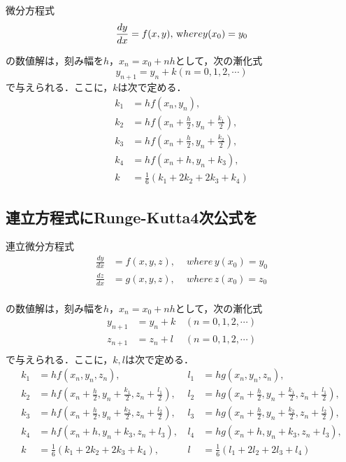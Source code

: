 \documentclass[11pt,dvipdfmx]{jsarticle}
\begin{document}
微分方程式 \[
\frac{dy}{dx} = f(x,y), \, {\textrm where}y(x_0)=y_0
\]

の数値解は，刻み幅を\(h\)，\(x_n=x_0+nh\)として，次の漸化式 \[
y_{n+1} = y_n +k (n=0,1,2,\cdots)
\] で与えられる．ここに，\(k\)は次で定める． \[
\begin{aligned}
k_1 & = hf(x_n,y_n), \\
k_2 & = hf(x_n+\frac{h}{2}, y_n+\frac{k_1}{2}), \\
k_3 & = hf(x_n+\frac{h}{2}, y_n+\frac{k_2}{2}), \\
k_4 & = hf(x_n+h, y_n+k_3), \\
k & = \frac{1}{6}(k_1+2k_2+2k_3+k_4)
\end{aligned}
\]

    \subsection{連立方程式にRunge-Kutta4次公式を}\label{ux9023ux7acbux65b9ux7a0bux5f0fux306brunge-kutta4ux6b21ux516cux5f0fux3092}

連立微分方程式 \[
\begin{aligned}
\frac{dy}{dx} &= f(x,y,z), &\, \, where \, y(x_0)=y_0 \\
\frac{dz}{dx} &= g(x,y,z), &\, \, where \, z(x_0)=z_0 \\
\end{aligned}
\]

の数値解は，刻み幅を\(h\)，\(x_n=x_0+nh\)として，次の漸化式 \[
\begin{aligned}
y_{n+1} & = y_n +k &\, (n=0,1,2,\cdots) \\
z_{n+1} & = z_n +l &\, (n=0,1,2,\cdots) \\
\end{aligned}
\] で与えられる．ここに，\(k,l\)は次で定める． \[
\begin{aligned}
k_1 &= hf(x_n,y_n,z_n), \,
&l_1 &= hg(x_n,y_n,z_n), \\
k_2 &= hf(x_n+\frac{h}{2}, y_n+\frac{k_1}{2}, z_n+\frac{l_1}{2}), \,
&l_2 &= hg(x_n+\frac{h}{2}, y_n+\frac{k_1}{2}, z_n+\frac{l_1}{2}), \\
k_3 &= hf(x_n+\frac{h}{2}, y_n+\frac{k_2}{2}, z_n+\frac{l_2}{2}), \,
&l_3 &= hg(x_n+\frac{h}{2}, y_n+\frac{k_2}{2}, z_n+\frac{l_2}{2}), \\
k_4 &= hf(x_n+h, y_n+k_3, z_n+l_3), \,
&l_4 &= hg(x_n+h, y_n+k_3, z_n+l_3), \\
k &= \frac{1}{6}(k_1+2k_2+2k_3+k_4), \,
&l &= \frac{1}{6}(l_1+2l_2+2l_3+l_4)
\end{aligned}
\]
\end{document}
